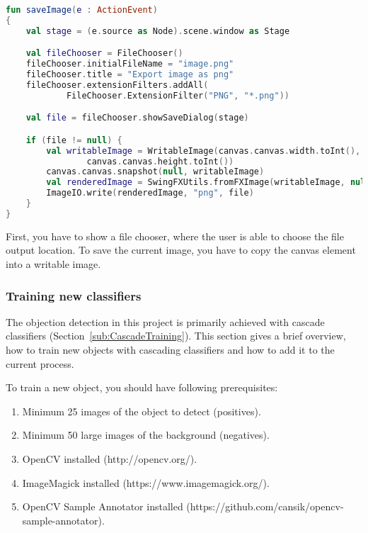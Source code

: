 \begin{lstlisting}[caption={Save image controller code.}, label={lst:saveImage}, language=Kotlin, escapechar=$]
fun saveImage(e : ActionEvent)
{
    val stage = (e.source as Node).scene.window as Stage

    val fileChooser = FileChooser()
    fileChooser.initialFileName = "image.png"
    fileChooser.title = "Export image as png"
    fileChooser.extensionFilters.addAll(
            FileChooser.ExtensionFilter("PNG", "*.png"))

    val file = fileChooser.showSaveDialog(stage)

    if (file != null) {
        val writableImage = WritableImage(canvas.canvas.width.toInt(),
                canvas.canvas.height.toInt())
        canvas.canvas.snapshot(null, writableImage)
        val renderedImage = SwingFXUtils.fromFXImage(writableImage, null)
        ImageIO.write(renderedImage, "png", file)
    }
}
\end{lstlisting}

First, you have to show a file chooser, where the user is able to choose the file output location. To save the current image, you have to copy the canvas element into a writable image.

\subsubsection{Training new classifiers}

The objection detection in this project is primarily achieved with cascade classifiers (Section~\ref{sub:CascadeTraining}). This section gives a brief overview, how to train new objects with cascading classifiers and how to add it to the current process.

To train a new object, you should have following prerequisites:

\renewcommand{\labelenumi}{\alph{enumi})}
\begin{enumerate}
    \item Minimum 25 images of the object to detect (positives).
    \item Minimum 50 large images of the background (negatives).
    \item OpenCV installed (http://opencv.org/).
    \item ImageMagick installed (https://www.imagemagick.org/).
    \item OpenCV Sample Annotator installed (https://github.com/cansik/opencv-sample-annotator).
\end{enumerate}

